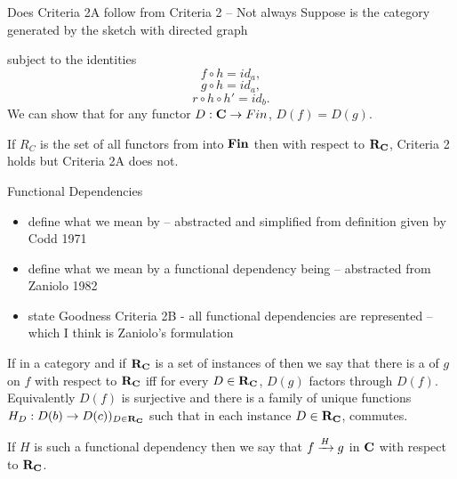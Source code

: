 \begin{frame}{Does Criteria 2A follow from Criteria 2 -- Not always}
Suppose \catcw is the category generated by the sketch with directed graph

subject to the identities
\begin{equation}
\label{fhidentity}
f \circ h = id_a,
\end{equation}
\begin{equation}
\label{ghidentity}
g \circ h = id_a,
\end{equation}
\begin{equation}
\label{rhhpidentity}
r \circ h \circ h' = id_b.
\end{equation}
We can show that for any functor $D:\catc \morph Fin$, $D(f)=D(g)$. 

If $R_C$ is the set of all functors from \catcw into $\Fin$ then with respect to $\reqtc$, Criteria 2 holds but Criteria 2A does not.
\end{frame}

\begin{frame}{Functional Dependencies}
\begin{itemize}
\item define what we mean by 
-- abstracted and simplified from definition given by Codd 1971
\item define what we mean by a functional dependency being 
-- abstracted from Zaniolo 1982
\item state Goodness Criteria 2B - all functional dependencies are represented -- which I think is Zaniolo's formulation 
\end{itemize}
\end{frame}

\begin{frame}
\begin{definition}
If \scalebox{0.9}{\fgsourcediagram} in a category \catcw  and if $\reqtc$ is a set of instances of \catcw
then we say that there is a   of $g$ on $f$ with respect to $\reqtc$ iff
for every $D \in \reqtc$, $D(g)$ factors  through $D(f)$. \\
\medskip
Equivalently $D(f)$ is surjective and there is a family of unique functions $H_D:D(b) \morph D(c))_{D \in \reqtc}$
such that in each instance $D \in \reqtc$,
 commutes.
\end{definition}

If $H$ is such a functional dependency then we say that $\fundep{H}{f}{g}$ in $\catc$ with respect to $\reqtc$.
\end{frame}

